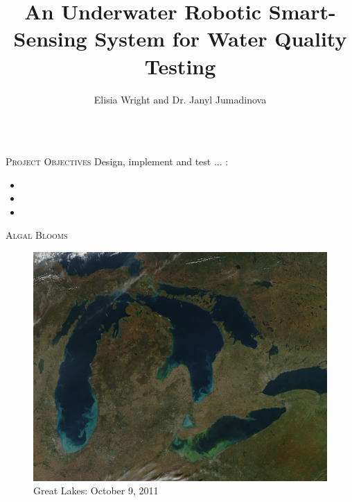 \documentclass[final,t]{beamer}
\title[]{An Underwater Robotic Smart-Sensing System for Water Quality Testing}
\author[Wright]{Elisia Wright and Dr. Janyl Jumadinova}
\institute{Department of Computer Science, Allegheny College}
\begin{document}
    \begin{frame}{}
        \vspace*{-6mm}
        \begin{columns}[t]

            \begin{column}{.5\linewidth}

                \begin{alertblock}{\textsc{Project Objectives}}
                    \vspace*{6mm}
                    Design, implement and test ... :
                    \begin{itemize}
                        \item
                        \item
                        \item
                    \end{itemize}
                    \vspace*{6mm}
                \end{alertblock}

                \begin{block}{\textsc{Algal Blooms}}
                    \vspace*{6mm}
                    \begin{figure}
                        \includegraphics[scale = 0.18]{assets/algalbloom.jpg}
                        \caption{Great Lakes: October 9, 2011}
                    \end{figure}
                    \vspace*{6mm}
                \end{block}


\end{column}
\end{columns}
\end{frame}
\end{document}
